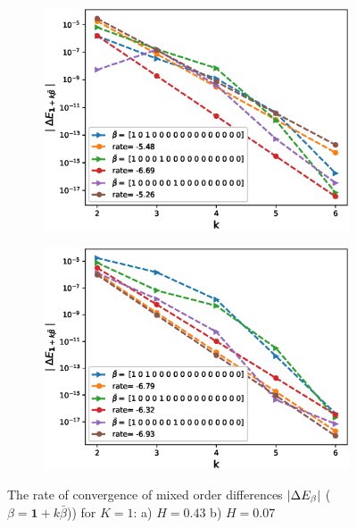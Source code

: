 \documentclass[11pt]{article}
\begin{document}
\begin{figure}[h!]
	\centering
	\begin{subfigure}{.5\textwidth}
		\centering
		\includegraphics[width=1\linewidth]{./figures/effect_H_differences/hierarchical/H_043/N_8/mixed_difference_order2_rbergomi_8steps_H_043_K_1_hierarch_with_rate_W1}
		\caption{}
		\label{fig:sub3}
	\end{subfigure}%
	\begin{subfigure}{.5\textwidth}
		\centering
		\includegraphics[width=1\linewidth]{./figures/effect_H_differences/hierarchical/H_007/N_8/mixed_difference_order2_rbergomi_8steps_H_007_K_1_hierarch_with_rate_W1}
		\caption{}
		\label{fig:sub4}
	\end{subfigure}
	
	\caption{The rate of convergence of  mixed order differences $\left\lvert\Delta E_{\beta}\right\rvert$ ($\beta=\mathbf{1}+k \bar{\beta}$)) for $K=1$: a) $H=0.43$ b)  $H=0.07$}
	\label{fig:test2}
\end{figure}
\end{document}
